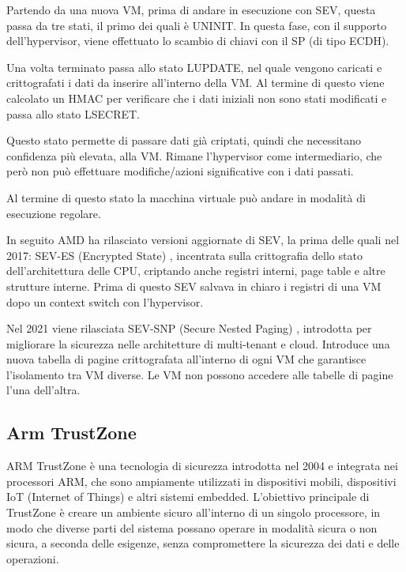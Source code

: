 \documentclass[12pt,italian]{report}
\begin{document}
	Partendo da una nuova VM, prima di andare in esecuzione con SEV, questa passa da tre stati, il primo dei quali è UNINIT. In questa fase, con il supporto dell'hypervisor, viene effettuato lo scambio di chiavi con il SP (di tipo ECDH). 
	
	Una volta terminato passa allo stato LUPDATE, nel quale vengono caricati e crittografati i dati da inserire all'interno della VM. Al termine di questo viene calcolato un HMAC per verificare che i dati iniziali non sono stati modificati e passa allo stato LSECRET.
	
	Questo stato permette di passare dati già criptati, quindi che necessitano confidenza più elevata, alla VM. Rimane l'hypervisor come intermediario, che però non può effettuare modifiche/azioni significative con i dati passati. 
	
	Al termine di questo stato la macchina virtuale può andare in modalità di esecuzione regolare.
	
	\bigbreak
	
	In seguito AMD ha rilasciato versioni aggiornate di SEV, la prima delle quali nel 2017: SEV-ES (Encrypted State) \cite{sev_es}, incentrata sulla crittografia dello stato dell'architettura delle CPU, criptando anche registri interni, page table e altre strutture interne. Prima di questo SEV salvava in chiaro i registri di una VM dopo un context switch con l'hypervisor.
	
	Nel 2021 viene rilasciata SEV-SNP (Secure Nested Paging) \cite{sev_snp}, introdotta per migliorare la sicurezza nelle architetture di multi-tenant e cloud. Introduce una nuova tabella di pagine crittografata all'interno di ogni VM che garantisce l'isolamento tra VM diverse. Le VM non possono accedere alle tabelle di pagine l'una dell'altra.
	
	\newpage
	
	\subsection{Arm TrustZone}
	\label{subsec:trustzone}
	ARM TrustZone è una tecnologia di sicurezza introdotta nel 2004 e integrata nei processori ARM, che sono ampiamente utilizzati in dispositivi mobili, dispositivi IoT (Internet of Things) e altri sistemi embedded. L'obiettivo principale di TrustZone è creare un ambiente sicuro all'interno di un singolo processore, in modo che diverse parti del sistema possano operare in modalità sicura o non sicura, a seconda delle esigenze, senza compromettere la sicurezza dei dati e delle operazioni.
	
\end{document}
